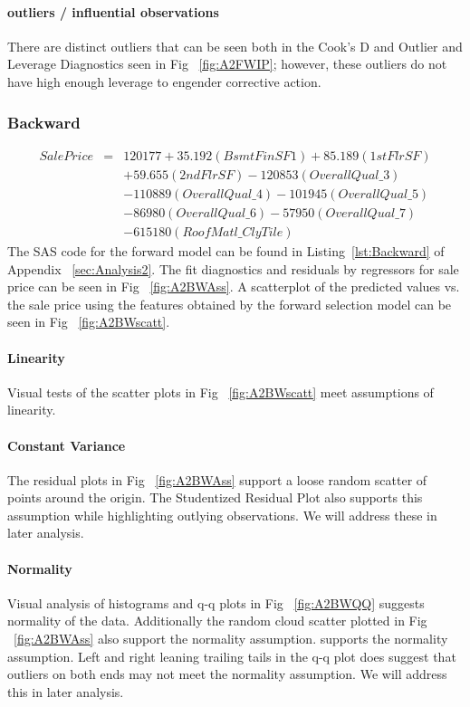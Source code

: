 \documentclass[11pt]{scrartcl} %
\begin{document}
\paragraph{outliers / influential observations} There are distinct outliers that can be seen both in the Cook's D and Outlier and Leverage Diagnostics seen in Fig ~\ref{fig:A2FWIP}; however, these outliers do not have high enough leverage to engender corrective action.

\subsubsection{Backward}
\begin{eqnarray*}
SalePrice &=& 120177 + 35.192(BsmtFinSF1) + 85.189(1stFlrSF) \\
& & + 59.655(2ndFlrSF) - 120853(OverallQual\_3)\\
& & - 110889(OverallQual\_4) - 101945(OverallQual\_5)\\
& & - 86980(OverallQual\_6) - 57950(OverallQual\_7) \\
& & - 615180(RoofMatl\_ClyTile)
\end{eqnarray*}
The SAS code for the forward model can be found in Listing~\ref{lst:Backward} of Appendix ~\ref{sec:Analysis2}.
The fit diagnostics and residuals by regressors for sale price can be seen in Fig ~\ref{fig:A2BWAss}. A scatterplot of the predicted values vs. the sale price using the features obtained by the forward selection model can be seen in Fig ~\ref{fig:A2BWscatt}.
\paragraph{Linearity} Visual tests of the scatter plots in Fig ~\ref{fig:A2BWscatt} meet assumptions of linearity.
\paragraph{Constant Variance} The residual plots in Fig ~\ref{fig:A2BWAss} support a loose random scatter of points around the origin. The Studentized Residual Plot also supports this assumption while highlighting outlying observations. We will address these in later analysis.
\paragraph{Normality} Visual analysis of histograms and q-q plots in Fig ~\ref{fig:A2BWQQ} suggests normality of the data. Additionally the random cloud scatter plotted in Fig ~\ref{fig:A2BWAss} also support the normality assumption. supports the normality assumption. Left and right leaning trailing tails in the q-q plot does suggest that outliers on both ends may not meet the normality assumption. We will address this in later analysis.
\end{document}
